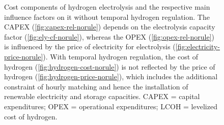\begin{figure}[h!]
    \caption{Cost components of hydrogen electrolysis and the respective main influence factors on it without temporal hydrogen regulation. The CAPEX (\ref{fig:capex-rel-norule}) depends on the electrolysis capacity factor (\ref{fig:ely-cf-norule}), whereas the OPEX (\ref{fig:opex-rel-norule}) is influenced by the price of electricity for electrolysis (\ref{fig:electricity-price-norule}). With temporal hydrogen regulation, the cost of hydrogen  (\ref{fig:hydrogen-cost-norule}) is not reflected by the price of hydrogen (\ref{fig:hydrogen-price-norule}), which includes the additional constraint of hourly matching and hence the installation of renewable electricity and storage capacities.
    CAPEX = capital expenditures;
    OPEX = operational expenditures;
    LCOH = levelized cost of hydrogen.
    }
    \label{fig:costbreakdown_norule}
\end{figure}


\clearpage